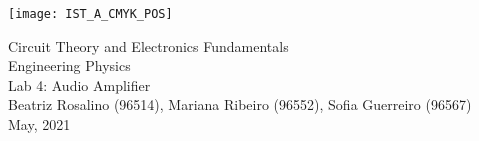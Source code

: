 
\thispagestyle {empty}

\texttt{[image: IST\_A\_CMYK\_POS]}

\begin{center}
%
\vspace{1.0cm}

\vspace{1cm}
{\FontLb Circuit Theory and Electronics Fundamentals} \\ %
\vspace{1cm}
{\FontSn Engineering Physics} \\ %
\vspace{1cm}
{\FontSn Lab 4: Audio Amplifier} \\
\vspace{1cm}
{\FontSn Beatriz Rosalino (96514), Mariana Ribeiro (96552), Sofia Guerreiro (96567)} \\
\vspace{1cm}
{ May, 2021} \\ %
%
\end{center}

